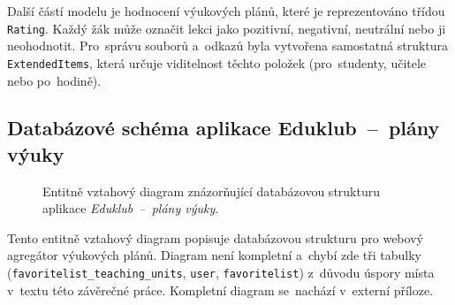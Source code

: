 \documentclass[male,czech,api_bc]{kitheses}
\begin{document}
Další částí modelu je hodnocení výukových plánů, které je reprezentováno třídou \texttt{Rating}. Každý žák může označit lekci jako pozitivní, negativní, neutrální nebo ji neohodnotit. Pro~správu souborů a~odkazů byla vytvořena samostatná struktura \texttt{ExtendedItems}, která určuje viditelnost těchto položek (pro~studenty, učitele nebo po~hodině).

\subsection{Databázové schéma aplikace Eduklub~--~plány výuky}

\begin{figure}[H]
	\centering
	\caption{Entitně vztahový diagram znázorňující databázovou strukturu aplikace \textit{Eduklub~--~plány výuky}.}
	\label{fig:erd-2}
\end{figure}

Tento entitně vztahový diagram popisuje databázovou strukturu pro webový agregátor výukových plánů. Diagram není kompletní a~chybí zde tři tabulky (\texttt{favoritelist\_teaching\_units}, \texttt{user}, \texttt{favoritelist}) z~důvodu úspory místa v~textu této závěrečné práce. Kompletní diagram se~nachází v~externí příloze.
\end{document}
